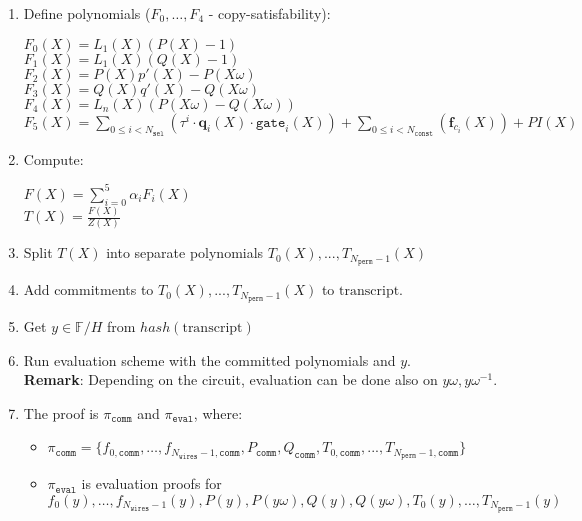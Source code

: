 \begin{enumerate}
    \item Define polynomials ($F_0, \dots, F_4$ - copy-satisfability):
    \begin{center}
        $F_0(X) = L_1(X)(P(X) - 1)$\\
        $F_1(X) = L_1(X)(Q(X) - 1)$ \\
        $F_2(X) = P(X)p'(X) - P(X\omega)$ \\
        $F_3(X) = Q(X)q'(X) - Q(X\omega)$ \\
        $F_4(X) = L_n(X)(P(X\omega) - Q(X\omega))$ \\
        $F_5(X) = \sum\limits_{0 \leq i < N_{\texttt{sel}}} (\tau^i \cdot \textbf{q}_{i}(X) \cdot \texttt{gate}_i(X))
        + \sum\limits_{0 \leq i < N_{\texttt{const}}}(\textbf{f}_{c_i}(X)) + PI(X)$
    \end{center}
    \item Compute:
    \begin{center}
        $F(X) = \sum\limits_{i = 0}^5 \alpha_iF_i(X)$ \\
        $T(X) = \frac{F(X)}{Z(X)}$
    \end{center}
    \item Split $T(X)$ into separate polynomials $T_0(X), ..., T_{N_{\texttt{perm}} - 1}(X)$
    \item Add commitments to $T_0(X), ..., T_{N_{\texttt{perm}} - 1}(X)$ to $\text{transcript}$.
    \item Get $y \in \mathbb{F}/H$ from $hash(\text{transcript})$
    \item Run evaluation scheme with the committed polynomials and $y$. \\
    \textbf{Remark}: Depending on the circuit, evaluation can be done also on $y\omega, y\omega^{-1}$.
    \item The proof is $\pi_{\texttt{comm}}$ and $\pi_{\texttt{eval}}$, where:
    \begin{itemize}
        \item $\pi_{\texttt{comm}} = \{f_{0, \texttt{comm}}, \dots, f_{N_{\texttt{wires}} - 1, \texttt{comm}},
        P_{\texttt{comm}}, Q_{\texttt{comm}}, T_{0, \texttt{comm}}, ..., T_{N_{\texttt{perm}} - 1, \texttt{comm}} \}$
        \item  $\pi_{\texttt{eval}}$ is evaluation proofs for $f_0(y), \dots, f_{N_{\texttt{wires}} - 1}(y), P(y), P(y\omega), Q(y), Q(y\omega), T_0(y), \dots, T_{N_{\texttt{perm}} - 1}(y)$
    \end{itemize}
\end{enumerate}

